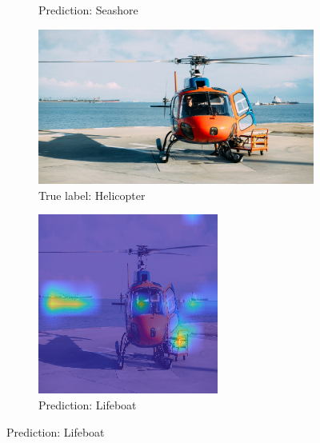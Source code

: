 \begin{figure}
\begin{subfigure}[b]{0.30\textwidth}
         \caption{Prediction: Seashore}
         \label{fig:layer-9}
     \end{subfigure}
     
     \vspace{0.5em}
     \begin{subfigure}[b]{0.30\textwidth}
         \centering
         \includegraphics[width=\textwidth]{images/chopper-1.jpeg}
         \caption{True label: Helicopter}
         \label{fig:layer-5}
     \end{subfigure}
     \hspace{1em}%
     \begin{subfigure}[b]{0.30\textwidth}
         \centering
         \includegraphics[width=\textwidth]{images/lifeboat-hm.png}
         \caption{Prediction: Lifeboat}
         \label{fig:layer-9}
     \end{subfigure}
     

\end{figure}
